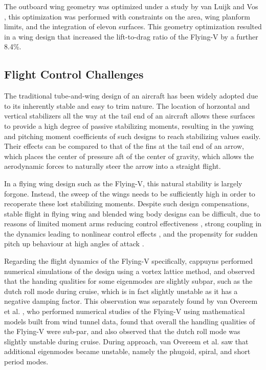 \documentclass[../report.tex]{subfiles}
\begin{document}
The outboard wing geometry was optimized under a study by van Luijk and Vos \cite{van2023constrained}, this optimization was performed with constraints on the area, wing planform limits, and the integration of elevon surfaces. This geometry optimization resulted in a wing design that increased the lift-to-drag ratio of the Flying-V by a further 8.4\%.

\subsection{Flight Control Challenges}\label{subsec:v_challenges}

The traditional tube-and-wing design of an aircraft has been widely adopted due to its inherently stable and easy to trim nature. The location of horzontal and vertical stabilizers all the way at the tail end of an aircraft allows these surfaces to provide a high degree of passive stabilizing moments, resulting in the yawing and pitching moment coefficients of such designs to reach stabilizing values easily. Their effects can be compared to that of the fins at the tail end of an arrow, which places the center of pressure aft of the center of gravity, which allows the aerodynamic forces to naturally steer the arrow into a straight flight.

In a flying wing design such as the Flying-V, this natural stability is largely forgone. Instead, the sweep of the wings needs to be sufficiently high in order to recoperate these lost stabilizing moments. Despite such design compensations, stable flight in flying wing and blended wing body designs can be difficult, due to reasons of limited moment arms reducing control effectiveness \cite{bad_moment_arm}, strong coupling in the dynamics leading to nonlinear control effects \cite{bad_coupling}, and the propensity for sudden pitch up behaviour at high angles of attack \cite{flying_wing_bad_1}.

Regarding the flight dynamics of the Flying-V specifically, cappuyns \cite{cappuyns2019handling} performed numerical simulations of the design using a vortex lattice method, and observed that the handing qualities for some eigenmodes are slightly subpar, such as the dutch roll mode during cruise, which is in fact slightly unstable as it has a negative damping factor. This observation was separately found by van Overeem et al. \cite{overeem_modelling}, who performed numerical studies of the Flying-V using mathematical models built from wind tunnel data, found that overall the handling qualities of the Flying-V were sub-par, and also observed that the dutch roll mode was slightly unstable during cruise. During approach, van Overeem et al. saw that additional eigenmodes became unstable, namely the phugoid, spiral, and short period modes.
\end{document}
